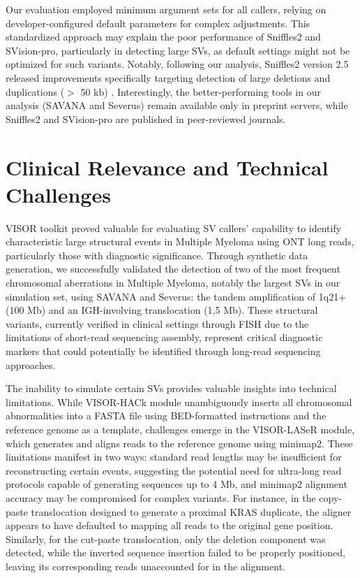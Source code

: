 Our evaluation employed minimum argument sets for all callers, relying on 
developer-configured default parameters for complex adjustments. This 
standardized approach may explain the poor performance of Sniffles2 and 
SVision-pro, particularly in detecting large SVs, as default settings might not 
be optimized for such variants. Notably, following our analysis, Sniffles2 
version 2.5 released improvements specifically targeting detection of large 
deletions and duplications ($>$ 50 kb) \cite{noauthor_releases_nodate}. 
Interestingly, the better-performing tools in our analysis (SAVANA and Severus) 
remain available only in preprint servers, while Sniffles2 and SVision-pro are 
published in peer-reviewed journals.

\section{Clinical Relevance and Technical Challenges}

VISOR toolkit proved valuable for evaluating SV callers' capability to identify 
characteristic large structural events in Multiple Myeloma using ONT long reads, 
particularly those with diagnostic significance. Through synthetic data 
generation, we successfully validated the detection of two of the most frequent 
chromosomal aberrations in Multiple Myeloma, notably the largest SVs in our 
simulation set, using SAVANA and Severus: the tandem amplification of 1q21+ 
(100 Mb) and an IGH-involving translocation (1,5 Mb). These structural variants, 
currently verified in clinical settings through FISH due to the limitations of 
short-read sequencing assembly, represent critical diagnostic markers that could 
potentially be identified through long-read sequencing approaches.

The inability to simulate certain SVs provides valuable insights into technical 
limitations. While VISOR-HACk module unambiguously inserts all chromosomal 
abnormalities into a FASTA file using BED-formatted instructions and the 
reference genome as a template, challenges emerge in the VISOR-LASeR module,
which generates and aligns reads to the reference genome using minimap2. These 
limitations manifest in two ways: standard read lengths may be insufficient for 
reconstructing certain events, suggesting the potential need for ultra-long read 
protocols capable of generating sequences up to 4 Mb, and minimap2 alignment 
accuracy may be compromised for complex variants. For instance, in the 
copy-paste translocation designed to generate a proximal KRAS duplicate, the 
aligner appears to have defaulted to mapping all reads to the original gene 
position. Similarly, for the cut-paste translocation, only the deletion 
component was detected, while the inverted sequence insertion failed to be 
properly positioned, leaving its corresponding reads unaccounted for in the 
alignment.

